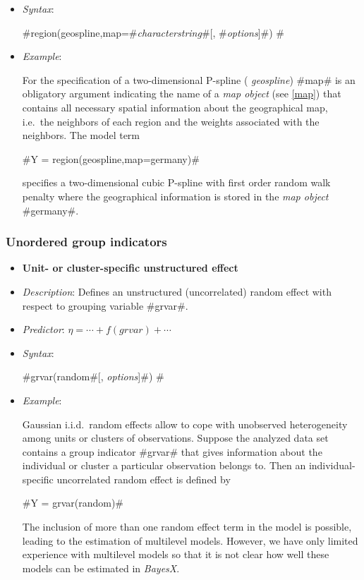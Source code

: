 \begin{itemize}
\item[] {\em Syntax}:

#region(geospline,map=#{\em characterstring}#[, #{\em options}]#) #
\item[] {\em Example}:

For the specification of a two-dimensional P-spline ({\em
geospline}) #map# is an obligatory argument indicating the name of
a {\em map object} (see \autoref{map}) that contains all necessary
spatial information about the geographical map, i.e.~the neighbors
of each region and the weights associated with the neighbors. The
model term

#Y = region(geospline,map=germany)#

specifies a two-dimensional cubic P-spline with first order random
walk penalty where the geographical information is stored in the
{\em map object} #germany#.
\end{itemize}

\subsubsection*{Unordered group indicators}

\begin{itemize}
\item[]{\bf\sffamily Unit- or cluster-specific unstructured
effect}

\item[] {\em Description}: Defines an unstructured (uncorrelated)
random effect with respect to grouping variable #grvar#. \item[]
{\em Predictor}: $\eta = \cdots + f(grvar) + \cdots$ \item[] {\em
Syntax}:

#grvar(random#[, {\em options}]#) #
\item[] {\em Example}:

Gaussian i.i.d.~random effects allow to cope with unobserved
heterogeneity among units or clusters of observations. Suppose the
analyzed data set contains a group indicator #grvar# that gives
information about the individual or cluster a particular
observation belongs to. Then an individual-specific uncorrelated
random effect is defined by

#Y = grvar(random)#

The inclusion of more than one random effect term in the model is
possible, leading to the estimation of multilevel models. However,
we have only limited experience with multilevel models so that it
is not clear how well these models can be estimated in {\em
BayesX}.
\end{itemize}


